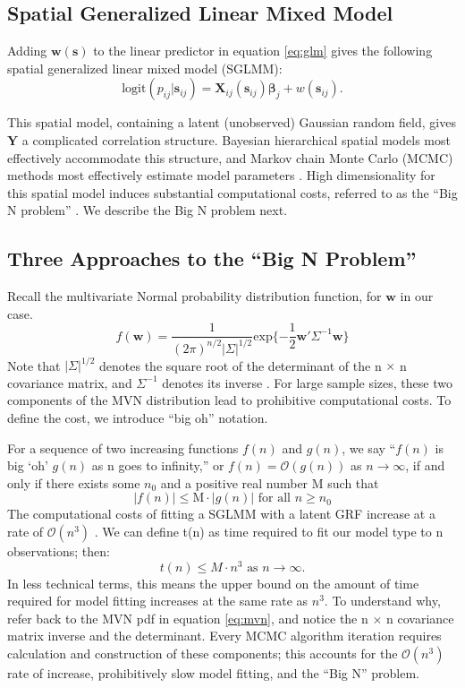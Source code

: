 \subsection{Spatial Generalized Linear Mixed Model}
Adding $\pmb{w}(\pmb{s})$ to the linear predictor in equation \ref{eq:glm} gives the following spatial generalized linear mixed model (SGLMM):
\begin{equation}
\text{logit}(p_{ij}|\pmb{s}_{ij}) = \pmb{X}_{ij}(\pmb{s}_{ij}) \pmb{\beta}_{j} + w(\pmb{s}_{ij}).
\end{equation}

This spatial model, containing a latent (unobserved) Gaussian random field, gives $\pmb{Y}$ a complicated correlation structure. Bayesian hierarchical spatial models most effectively accommodate this structure, and Markov chain Monte Carlo (MCMC) methods most effectively estimate model parameters \citep{Banerjee2014}. High dimensionality for this spatial model induces substantial computational costs, referred to as the ``Big N problem'' \citep{Lindgren2011}. We describe the Big N problem next.

\subsection{Three Approaches to the ``Big N Problem''}

Recall the multivariate Normal probability distribution function, for $\pmb{w}$ in our case.
\begin{equation} \label{eq:mvn}
f(\pmb{w}) = \frac{1}{(2\pi)^{n/2}|\Sigma|^{1/2}} \text{exp}\{ -\frac{1}{2}\pmb{w}'\Sigma^{-1}\pmb{w} \}
\end{equation}
Note that $|\Sigma|^{1/2}$ denotes the square root of the determinant of the n $\times$ n covariance matrix, and $\Sigma^{-1}$ denotes its inverse \citep{Lay}. For large sample sizes, these two components of the MVN distribution lead to prohibitive computational costs. To define the cost, we introduce ``big oh'' notation. 

For a sequence of two increasing functions $f(n)$ and $g(n)$, we say ``$f(n)$ is big `oh' $g(n)$ as n goes to infinity,'' or $f(n) = \mathcal{O}(g(n))$ as $n \rightarrow \infty$, if and only if there exists some $n_{0}$ and a positive real number M such that
  $$|f(n)| \leq \text{M} \cdot |g(n)| \text{ for all } n \geq n_0 $$
The computational costs of fitting a SGLMM with a latent GRF increase at a rate of $\mathcal{O}(n^{3})$ \citep{Finley2009}. We can define t(n) as time required to fit our model type to n observations; then:
$$t(n) \leq M \cdot n^{3} \text{ as } n \rightarrow \infty.$$
In less technical terms, this means the upper bound on the amount of time required for model fitting increases at the same rate as $n^{3}$. To understand why, refer back to the MVN pdf in equation \ref{eq:mvn}, and notice the n $\times$ n covariance matrix inverse and the determinant. Every MCMC algorithm iteration requires calculation and construction of these components; this accounts for the $\mathcal{O}(n^{3})$ rate of increase, prohibitively slow model fitting, and the ``Big N'' problem. 

